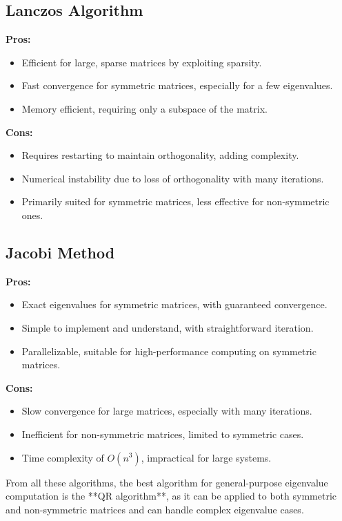 \documentclass[journal]{IEEEtran}
\begin{document}
\subsection*{Lanczos Algorithm}
\textbf{Pros:}
\begin{itemize}
    \item Efficient for large, sparse matrices by exploiting sparsity.
    \item Fast convergence for symmetric matrices, especially for a few eigenvalues.
    \item Memory efficient, requiring only a subspace of the matrix.
\end{itemize}
\textbf{Cons:}
\begin{itemize}
    \item Requires restarting to maintain orthogonality, adding complexity.
    \item Numerical instability due to loss of orthogonality with many iterations.
    \item Primarily suited for symmetric matrices, less effective for non-symmetric ones.
\end{itemize}

\subsection*{Jacobi Method}
\textbf{Pros:}
\begin{itemize}
    \item Exact eigenvalues for symmetric matrices, with guaranteed convergence.
    \item Simple to implement and understand, with straightforward iteration.
    \item Parallelizable, suitable for high-performance computing on symmetric matrices.
\end{itemize}
\textbf{Cons:}
\begin{itemize}
    \item Slow convergence for large matrices, especially with many iterations.
    \item Inefficient for non-symmetric matrices, limited to symmetric cases.
    \item Time complexity of $O(n^3)$, impractical for large systems.
\end{itemize}

From all these algorithms, the best algorithm for general-purpose eigenvalue computation is the **QR algorithm**, as it can be applied to both symmetric and non-symmetric matrices and can handle complex eigenvalue cases.
\end{document}
